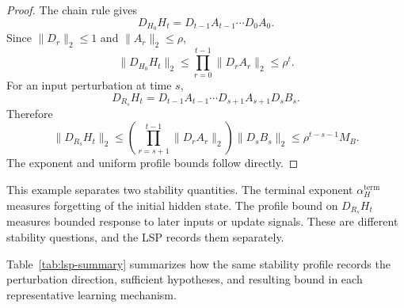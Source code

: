 \documentclass{article}
\numberwithin{equation}{section}
\begin{document}
\begin{proof}
The chain rule gives
\[
D_{H_0}H_t
=
D_{t-1}A_{t-1}\cdots D_0A_0 .
\]
Since \(\|D_r\|_2\le1\) and \(\|A_r\|_2\le\rho\),
\[
\|D_{H_0}H_t\|_2
\le
\prod_{r=0}^{t-1}\|D_rA_r\|_2
\le
\rho^t .
\]
For an input perturbation at time \(s\),
\[
D_{R_s}H_t
=
D_{t-1}A_{t-1}\cdots D_{s+1}A_{s+1}D_sB_s .
\]
Therefore
\[
\|D_{R_s}H_t\|_2
\le
\left(\prod_{r=s+1}^{t-1}\|D_rA_r\|_2\right)\|D_sB_s\|_2
\le
\rho^{t-s-1}M_B .
\]
The exponent and uniform profile bounds follow directly.
\end{proof}

This example separates two stability quantities. The terminal exponent \(\alpha_H^{\mathrm{term}}\) measures forgetting of the initial hidden state. The profile bound on \(D_{R_s}H_t\) measures bounded response to later inputs or update signals. These are different stability questions, and the LSP records them separately.

Table~\ref{tab:lsp-summary} summarizes how the same stability profile records
the perturbation direction, sufficient hypotheses, and resulting bound in each
representative learning mechanism.
\end{document}
